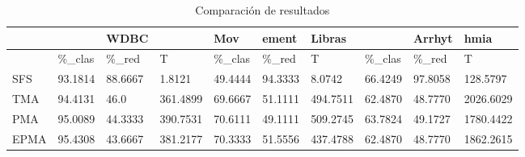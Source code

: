 \begin{table}[H]
	\centering
	\small
	\begin{tabular}{l|lll|lll|lll}
				& 			& WDBC 		&			&	  Mov	& ement 	& Libras	&			& Arrhyt	& hmia		\\ \hline
				& \%\_clas	& \%\_red	& T			& \%\_clas	& \%\_red	& T			& \%\_clas	& \%\_red	& T			\\ \hline
		SFS		& 93.1814	& 88.6667	& 1.8121	& 49.4444	& 94.3333	& 8.0742	& 66.4249	& 97.8058	& 128.5797	\\ \hline
		TMA		& 94.4131	& 46.0		& 361.4899	& 69.6667	& 51.1111	& 494.7511	& 62.4870	& 48.7770	& 2026.6029	\\ \hline
		PMA		& 95.0089	& 44.3333	& 390.7531	& 70.6111	& 49.1111	& 509.2745	& 63.7824	& 49.1727	& 1780.4422	\\ \hline
		EPMA	& 95.4308	& 43.6667	& 381.2177	& 70.3333	& 51.5556	& 437.4788	& 62.4870	& 48.7770	& 1862.2615
		
	\end{tabular}
	\caption{Comparación de resultados}
	\label{Compare}
\end{table}